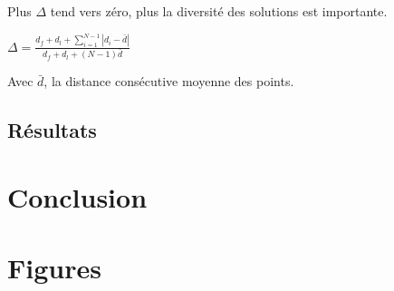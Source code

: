 \documentclass[12pt, letterpaper]{article}
\begin{document}
Plus $\Delta$ tend vers zéro, plus la diversité des solutions est
importante.

\begin{center}
  $\Delta = \frac{d_f + d_l + \sum_{i = 1}^{N - 1} |d_i - \bar{d}|}{d_f + d_l + (N - 1) \bar{d}}$
\end{center}

Avec $\bar{d}$, la distance consécutive moyenne des points.

\subsection{Résultats}

\newpage

\section{Conclusion}


\newpage

\section{Figures}

\FloatBarrier
\end{document}
